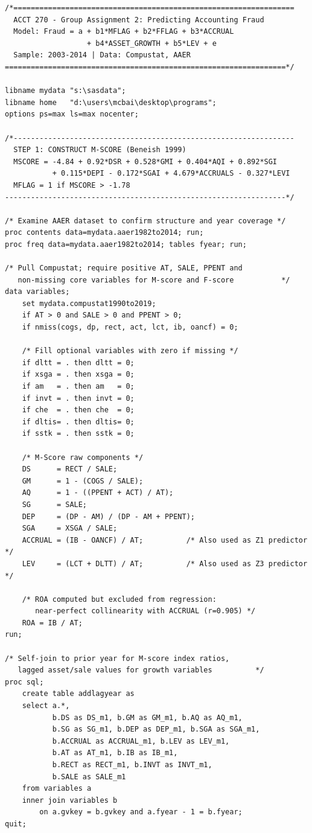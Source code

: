 \documentclass[12pt]{article}
\begin{document}
\lstset{style=sas}
\begin{lstlisting}
/*=================================================================
  ACCT 270 - Group Assignment 2: Predicting Accounting Fraud
  Model: Fraud = a + b1*MFLAG + b2*FFLAG + b3*ACCRUAL
                   + b4*ASSET_GROWTH + b5*LEV + e
  Sample: 2003-2014 | Data: Compustat, AAER
=================================================================*/

libname mydata "s:\sasdata";
libname home   "d:\users\mcbai\desktop\programs";
options ps=max ls=max nocenter;

/*-----------------------------------------------------------------
  STEP 1: CONSTRUCT M-SCORE (Beneish 1999)
  MSCORE = -4.84 + 0.92*DSR + 0.528*GMI + 0.404*AQI + 0.892*SGI
           + 0.115*DEPI - 0.172*SGAI + 4.679*ACCRUALS - 0.327*LEVI
  MFLAG = 1 if MSCORE > -1.78
-----------------------------------------------------------------*/

/* Examine AAER dataset to confirm structure and year coverage */
proc contents data=mydata.aaer1982to2014; run;
proc freq data=mydata.aaer1982to2014; tables fyear; run;

/* Pull Compustat; require positive AT, SALE, PPENT and
   non-missing core variables for M-score and F-score           */
data variables;
    set mydata.compustat1990to2019;
    if AT > 0 and SALE > 0 and PPENT > 0;
    if nmiss(cogs, dp, rect, act, lct, ib, oancf) = 0;

    /* Fill optional variables with zero if missing */
    if dltt = . then dltt = 0;
    if xsga = . then xsga = 0;
    if am   = . then am   = 0;
    if invt = . then invt = 0;
    if che  = . then che  = 0;
    if dltis= . then dltis= 0;
    if sstk = . then sstk = 0;

    /* M-Score raw components */
    DS      = RECT / SALE;
    GM      = 1 - (COGS / SALE);
    AQ      = 1 - ((PPENT + ACT) / AT);
    SG      = SALE;
    DEP     = (DP - AM) / (DP - AM + PPENT);
    SGA     = XSGA / SALE;
    ACCRUAL = (IB - OANCF) / AT;          /* Also used as Z1 predictor */
    LEV     = (LCT + DLTT) / AT;          /* Also used as Z3 predictor */

    /* ROA computed but excluded from regression:
       near-perfect collinearity with ACCRUAL (r=0.905) */
    ROA = IB / AT;
run;

/* Self-join to prior year for M-score index ratios,
   lagged asset/sale values for growth variables          */
proc sql;
    create table addlagyear as
    select a.*,
           b.DS as DS_m1, b.GM as GM_m1, b.AQ as AQ_m1,
           b.SG as SG_m1, b.DEP as DEP_m1, b.SGA as SGA_m1,
           b.ACCRUAL as ACCRUAL_m1, b.LEV as LEV_m1,
           b.AT as AT_m1, b.IB as IB_m1,
           b.RECT as RECT_m1, b.INVT as INVT_m1,
           b.SALE as SALE_m1
    from variables a
    inner join variables b
        on a.gvkey = b.gvkey and a.fyear - 1 = b.fyear;
quit;


\end{lstlisting}
\end{document}
